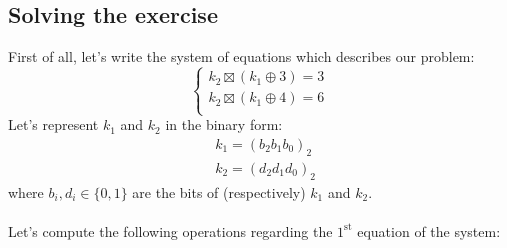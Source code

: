 \subsection{Solving the exercise}
First of all, let's write the system of equations which describes our problem:
\begin{equation*}
    \begin{cases}
        k_2\boxtimes(k_1\oplus3)=3\\
        k_2\boxtimes(k_1\oplus4)=6\\
    \end{cases}
\end{equation*}
Let's represent $k_1$ and $k_2$ in the binary form:
\begin{align*}
    &k_1=(b_2b_1b_0)_2\\
    &k_2=(d_2d_1d_0)_2
\end{align*}
where $b_i,d_i\in\{0,1\}$ are the bits of (respectively) $k_1$ and $k_2$.\\\\
Let's compute the following operations regarding the $1^{\text{st}}$ equation of the system:
